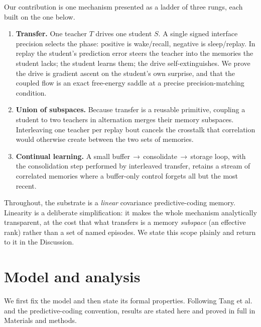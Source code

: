 \documentclass[10pt,letterpaper]{article}
\theoremstyle{plain}
\theoremstyle{remark}
\begin{document}
Our contribution is one mechanism presented as a ladder of three rungs, each built on the one below.

\begin{enumerate}
\item \textbf{Transfer.} One teacher $T$ drives one student $S$. A single signed interface precision
selects the phase: positive is wake/recall, negative is sleep/replay. In replay the student's
prediction error steers the teacher into the memories the student lacks; the student learns them; the
drive self-extinguishes. We prove the drive is gradient ascent on the student's own surprise, and that
the coupled flow is an exact free-energy saddle at a precise precision-matching condition.
\item \textbf{Union of subspaces.} Because transfer is a reusable primitive, coupling a student to two
teachers in alternation merges their memory subspaces. Interleaving one teacher per replay bout cancels
the crosstalk that correlation would otherwise create between the two sets of memories.
\item \textbf{Continual learning.} A small buffer\,$\to$\,consolidate\,$\to$\,storage loop, with the
consolidation step performed by interleaved transfer, retains a stream of correlated memories where a
buffer-only control forgets all but the most recent.
\end{enumerate}

Throughout, the substrate is a \emph{linear} covariance predictive-coding memory. Linearity is a
deliberate simplification: it makes the whole mechanism analytically transparent, at the cost that what
transfers is a memory \emph{subspace} (an effective rank) rather than a set of named episodes. We state
this scope plainly and return to it in the Discussion.

\section{Model and analysis}
We first fix the model and then state its formal properties. Following Tang et al.\ \cite{tang2023covpcn}
and the predictive-coding convention, results are stated here and proved in full in Materials and methods.
\end{document}
